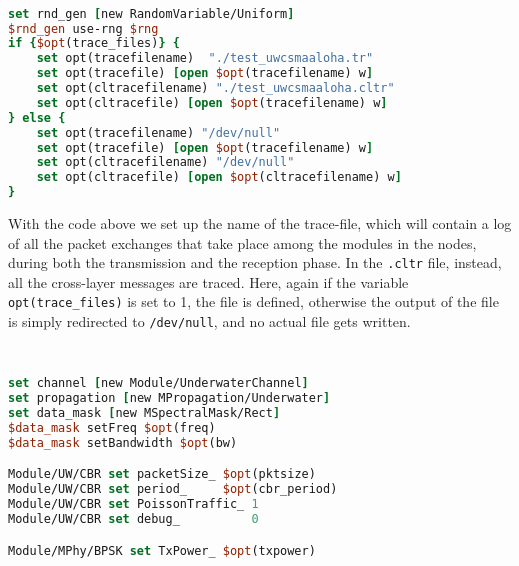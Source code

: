 \documentclass[11pt]{article}
\begin{document}
{\scriptsize\tt
\begin{lstlisting}[language=tcl]
set rnd_gen [new RandomVariable/Uniform]
$rnd_gen use-rng $rng
if {$opt(trace_files)} {
    set opt(tracefilename) 	"./test_uwcsmaaloha.tr"
    set opt(tracefile) [open $opt(tracefilename) w]
    set opt(cltracefilename) "./test_uwcsmaaloha.cltr"
    set opt(cltracefile) [open $opt(tracefilename) w]
} else {
    set opt(tracefilename) "/dev/null"
    set opt(tracefile) [open $opt(tracefilename) w]
    set opt(cltracefilename) "/dev/null"
    set opt(cltracefile) [open $opt(cltracefilename) w]
}

\end{lstlisting}
}
With the code above we set up the name of the trace-file, which will contain a log of all the packet exchanges that take place among the modules in the nodes, during both the transmission and the reception phase.
In the {\tt .cltr} file, instead, all the cross-layer messages are traced.
Here, again if the variable {\tt opt(trace\_files)} is set to 1, the file is defined, otherwise the output of the file is simply redirected to {\tt /dev/null}, and no actual file gets written.\\

{\scriptsize\tt
\begin{lstlisting}[language=tcl]
set channel [new Module/UnderwaterChannel]
set propagation [new MPropagation/Underwater]
set data_mask [new MSpectralMask/Rect]
$data_mask setFreq $opt(freq)
$data_mask setBandwidth $opt(bw)

Module/UW/CBR set packetSize_ $opt(pktsize)
Module/UW/CBR set period_     $opt(cbr_period)
Module/UW/CBR set PoissonTraffic_ 1
Module/UW/CBR set debug_          0

Module/MPhy/BPSK set TxPower_ $opt(txpower)
\end{lstlisting}
}
\end{document}
